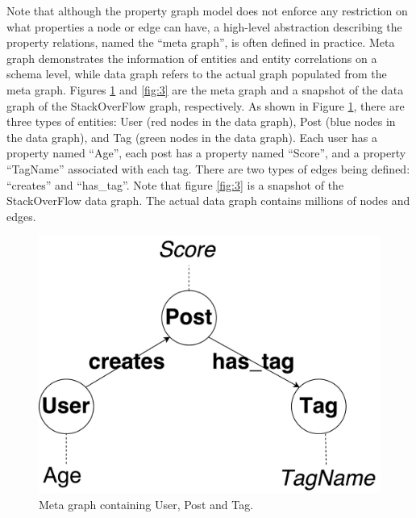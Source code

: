 Note that although the property graph model does not enforce any restriction on what properties a node or edge can have, a high-level abstraction describing the property relations, named the ``meta graph'', is often defined in practice. Meta graph demonstrates the information of entities and entity correlations on a schema level, while data graph refers to the actual graph populated from the meta graph. Figures \ref{fig:2} and \ref{fig:3} are the meta graph and a snapshot of the data graph of the StackOverFlow graph, respectively. As shown in Figure \ref{fig:2}, there are three types of entities: User (red nodes in the data graph), Post (blue nodes in the data graph), and Tag (green nodes in the data graph). Each user has a property named ``Age'', each post has a property named ``Score'', and a property ``TagName'' associated with each tag. There are two types of edges being  defined: ``creates'' and ``has\_tag''. Note that figure \ref{fig:3} is a snapshot of the StackOverFlow data graph. The actual data graph contains millions of nodes and edges. 


\begin{figure}
	\centering
	\includegraphics[scale=0.5]{pic/12.pdf}
	\caption{Meta graph containing User, Post and Tag.}
	\label{fig:2}
\end{figure}

